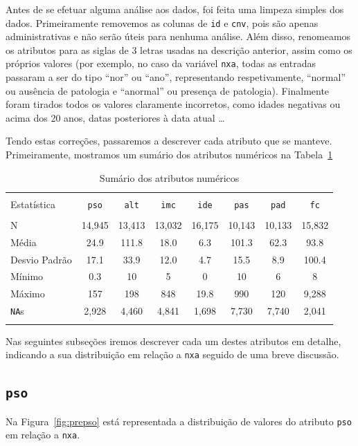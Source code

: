\documentclass[10pt, conference, compsocconf]{IEEEtran}
\begin{document}
Antes de se efetuar alguma análise aos dados, foi feita uma limpeza
simples dos dados. Primeiramente removemos as colunas de {\tt id} e
{\tt cnv}, pois são apenas administrativas e não serão úteis para
nenhuma análise. Além disso, renomeamos os atributos para as siglas de
3 letras usadas na descrição anterior, assim como os próprios valores
(por exemplo, no caso da variável {\tt nxa}, todas as entradas
passaram a ser do tipo ``nor'' ou ``ano'', representando
respetivamente, ``normal'' ou ausência de patologia e ``anormal'' ou
presença de patologia). Finalmente foram tirados todos os valores
claramente incorretos, como idades negativas ou acima dos 20 anos,
datas posteriores à data atual \ldots

Tendo estas correções, passaremos a descrever cada atributo que se
manteve. Primeiramente, mostramos um sumário dos atributos numéricos
na Tabela~\ref{tab:nua}

\begin{table}[!ht] \centering 
  \caption{Sumário dos atributos numéricos}
  \label{tab:nua} 
  \begin{tabular}{@{\extracolsep{5pt}}lccccccc} 
    \\[-1.8ex]\hline 
    \hline \\[-1.8ex] 
    Estatística & {\tt pso} & {\tt alt} & {\tt imc} & {\tt ide} & {\tt pas} & {\tt pad} & {\tt fc} \\ 
    \hline \\[-1.8ex] 
    N & 14,945 & 13,413 & 13,032 & 16,175 & 10,143 & 10,133 & 15,832 \\ 
    Média & 24.9 & 111.8 & 18.0 & 6.3 & 101.3 & 62.3 & 93.8 \\ 
    Desvio Padrão & 17.1 & 33.9 & 12.0 & 4.7 & 15.5 & 8.9 & 100.4 \\ 
    Mínimo & 0.3 & 10 & 5 & 0 & 10 & 6 & 8 \\ 
    Máximo & 157 & 198 & 848 & 19.8 & 990 & 120 & 9,288 \\ 
    {\tt NA}s & 2,928 & 4,460 & 4,841 & 1,698 & 7,730 & 7,740 & 2,041\\
    \hline \\[-1.8ex] 
  \end{tabular}
\end{table}

Nas seguintes subseções iremos descrever cada um destes atributos em
detalhe, indicando a sua distribuição em relação a {\tt nxa} seguido
de uma breve discussão.

\subsection{\texttt{pso}}
Na Figura~\ref{fig:prepso} está representada a distribuição de valores
do atributo {\tt pso} em relação a {\tt nxa}.
\end{document}
